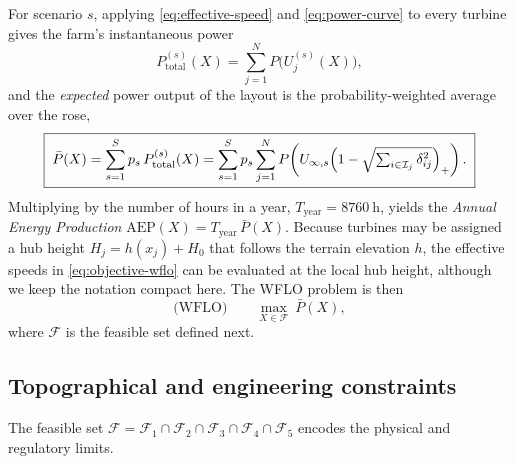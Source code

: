 \documentclass[11pt,a4paper]{article}
\begin{document}
For scenario $s$, applying \eqref{eq:effective-speed} and \eqref{eq:power-curve}
to every turbine gives the farm's instantaneous power
\begin{equation}
  P_{\text{total}}^{(s)}(X)
  = \sum_{j=1}^{N} P\bigl(U_{j}^{(s)}(X)\bigr),
  \label{eq:power-scenario}
\end{equation}
and the \emph{expected} power output of the layout is the probability-weighted
average over the rose,
\begin{equation}
  \boxed{\;
  \bar{P}(X)
  = \sum_{s=1}^{S} p_{s}\, P_{\text{total}}^{(s)}(X)
  = \sum_{s=1}^{S} p_{s} \sum_{j=1}^{N}
      P\!\left( U_{\infty,s}
      \Bigl(1-\sqrt{\textstyle\sum_{i\in\mathcal{I}_{j}} \delta_{ij}^{2}}\Bigr)_{+} \right).
  \;}
  \label{eq:objective-wflo}
\end{equation}
Multiplying by the number of hours in a year, $T_{\text{year}}=8760\ \text{h}$,
yields the \emph{Annual Energy Production} $\text{AEP}(X)=T_{\text{year}}\,
\bar{P}(X)$. Because turbines may be assigned a hub height $H_{j}=h(x_{j})+H_{0}$
that follows the terrain elevation $h$, the effective speeds in
\eqref{eq:objective-wflo} can be evaluated at the local hub height, although we
keep the notation compact here. The WFLO problem is then
\begin{equation}
  \text{(WFLO)} \qquad
  \max_{X \in \mathcal{F}} \ \bar{P}(X),
  \label{eq:wflo}
\end{equation}
where $\mathcal{F}$ is the feasible set defined next.

\subsection{Topographical and engineering constraints}

The feasible set $\mathcal{F}=\mathcal{F}_{1}\cap\mathcal{F}_{2}\cap
\mathcal{F}_{3}\cap\mathcal{F}_{4}\cap\mathcal{F}_{5}$ encodes the physical and
regulatory limits.
\end{document}
